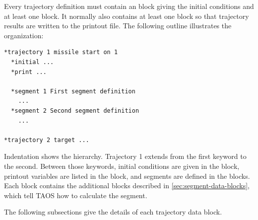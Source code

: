 Every trajectory definition must contain an  block giving the
initial conditions and at least one  block. It normally also
contains at least one  block so that trajectory results are
written to the printout file. The following outline illustrates the organization:

\begin{lstlisting}[style=taosmanual]
*trajectory 1 missile start on 1
  *initial ...
  *print ...

  *segment 1 First segment definition
    ...
  *segment 2 Second segment definition
    ...

*trajectory 2 target ...
\end{lstlisting}

Indentation shows the hierarchy. Trajectory 1 extends from the first
 keyword to the second. Between those keywords, initial
conditions are given in the  block, printout variables are
listed in the  block, and segments are defined in the
 blocks. Each  block contains the
additional blocks described in \cref{sec:segment-data-blocks}, which tell TAOS how
to calculate the segment.

The following subsections give the details of each trajectory data block.
